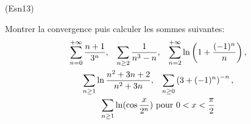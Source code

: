 \begin{tiny}(Esn13)\end{tiny} Montrer la convergence puis calculer les sommes suivantes:
\begin{multline*}
  \sum_{n=0}^{+\infty}\frac{n+1}{3^n},\hspace{0.3cm}
  \sum_{n\geq 2} \frac{1}{n^3 - n},\hspace{0.3cm}
  \sum_{n=2}^{+\infty}\ln\left( 1+\frac{(-1)^n}{n}\right), \\
  \sum_{n\geq 1}\ln\frac{n^2+3n+2}{n^2+3n}, \hspace{0.3cm}
  \sum_{n\geq 0}\left( 3+(-1)^n\right)^{-n}, \\
  \sum_{n\geq 1}\ln(\cos\frac{x}{2^n}) \text{ pour } 0< x < \frac{\pi}{2}
\end{multline*}
